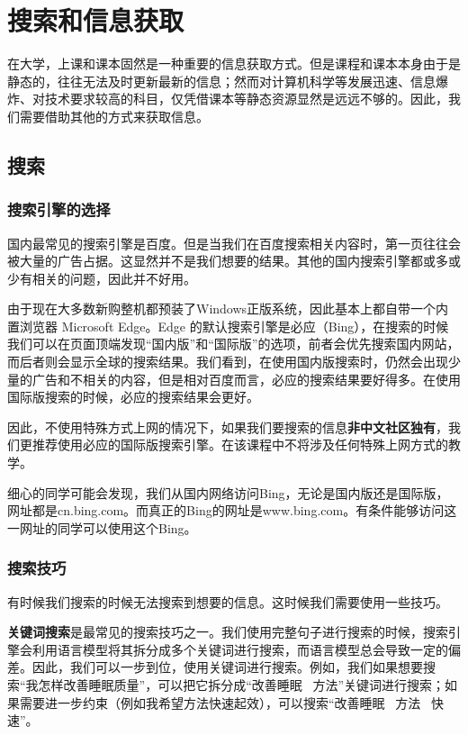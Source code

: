 \chapter{搜索和信息获取} %

在大学，上课和课本固然是一种重要的信息获取方式。但是课程和课本本身由于是静态的，往往无法及时更新最新的信息；然而对计算机科学等发展迅速、信息爆炸、对技术要求较高的科目，仅凭借课本等静态资源显然是远远不够的。因此，我们需要借助其他的方式来获取信息。

\section{搜索}

\subsection{搜索引擎的选择}

国内最常见的搜索引擎是百度。但是当我们在百度搜索相关内容时，第一页往往会被大量的广告占据。这显然并不是我们想要的结果。其他的国内搜索引擎都或多或少有相关的问题，因此并不好用。

由于现在大多数新购整机都预装了Windows正版系统，因此基本上都自带一个内置浏览器 Microsoft Edge。Edge 的默认搜索引擎是必应（Bing），在搜索的时候我们可以在页面顶端发现“国内版”和“国际版”的选项，前者会优先搜索国内网站，而后者则会显示全球的搜索结果。我们看到，在使用国内版搜索时，仍然会出现少量的广告和不相关的内容，但是相对百度而言，必应的搜索结果要好得多。在使用国际版搜索的时候，必应的搜索结果会更好。

因此，不使用特殊方式上网的情况下，如果我们要搜索的信息\textbf{非中文社区独有}，我们更推荐使用必应的国际版搜索引擎。在该课程中不将涉及任何特殊上网方式的教学。

\begin{note}
  细心的同学可能会发现，我们从国内网络访问Bing，无论是国内版还是国际版，网址都是cn.bing.com。而真正的Bing的网址是www.bing.com。有条件能够访问这一网址的同学可以使用这个Bing。
\end{note}

\subsection{搜索技巧}

有时候我们搜索的时候无法搜索到想要的信息。这时候我们需要使用一些技巧。

\textbf{关键词搜索}是最常见的搜索技巧之一。我们使用完整句子进行搜索的时候，搜索引擎会利用语言模型将其拆分成多个关键词进行搜索，而语言模型总会导致一定的偏差。因此，我们可以一步到位，使用关键词进行搜索。例如，我们如果想要搜索“我怎样改善睡眠质量”，可以把它拆分成“改善睡眠 \ 方法”关键词进行搜索；如果需要进一步约束（例如我希望方法快速起效），可以搜索“改善睡眠 \ 方法 \ 快速”。

